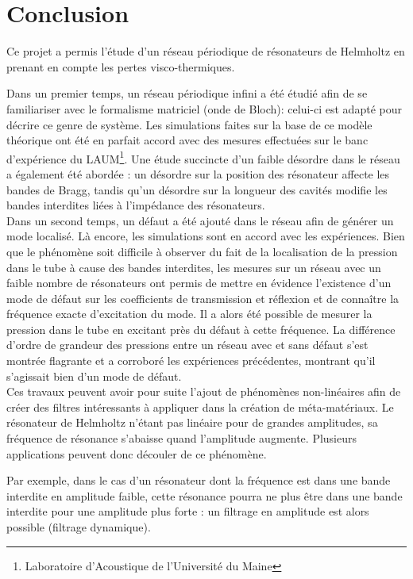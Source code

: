 \chapter*{Conclusion}

Ce projet a permis l'étude d'un réseau périodique de résonateurs de Helmholtz en prenant en compte les pertes visco-thermiques. 

Dans un premier temps, un réseau périodique infini a été étudié afin de se familiariser avec le formalisme matriciel (onde de Bloch): celui-ci est adapté pour décrire ce genre de système. Les simulations faites sur la base de ce modèle théorique ont été en parfait accord avec des mesures effectuées sur le banc d'expérience du LAUM\footnote{\samepage Laboratoire d'Acoustique de l'Université du Maine}. Une étude succincte d'un faible désordre dans le réseau a également été abordée : un désordre sur la position des résonateur affecte les bandes de Bragg, tandis qu'un désordre sur la longueur des cavités modifie les bandes interdites liées à l'impédance des résonateurs.\\

 
Dans un second temps, un défaut a été ajouté dans le réseau afin de générer un mode localisé. Là encore, les simulations sont en accord avec les expériences. Bien que le phénomène soit difficile à observer du fait de la localisation de la pression dans le tube à cause des bandes interdites, les mesures sur un réseau avec un faible nombre de résonateurs ont permis de mettre en évidence l’existence d'un mode de défaut sur les coefficients de transmission et réflexion et de connaître la fréquence exacte d’excitation du mode. Il a alors été possible de mesurer la pression dans le tube en excitant près du défaut à cette fréquence. La différence d'ordre de grandeur des pressions entre un réseau avec et sans défaut s'est montrée flagrante et a corroboré les expériences précédentes, montrant qu'il s'agissait bien d'un mode de défaut.\\

Ces travaux peuvent avoir pour suite l'ajout de phénomènes non-linéaires afin de créer des filtres intéressants à appliquer dans la création de méta-matériaux. Le résonateur de Helmholtz n'étant pas linéaire pour de grandes amplitudes, sa fréquence de résonance s'abaisse quand l'amplitude augmente. Plusieurs applications peuvent donc découler de ce phénomène.

Par exemple, dans le cas d'un résonateur dont la fréquence est dans une bande interdite en amplitude faible, cette résonance pourra ne plus être dans une bande interdite pour une amplitude plus forte : un filtrage en amplitude est alors possible (filtrage dynamique).


